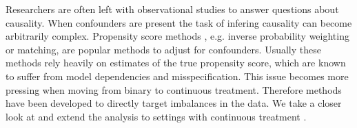 






Researchers are often left with observational studies to answer questions about causality. When confounders are present the task of infering causality can become arbitrarily complex. Propensity score methods \cite{Rosenbaum1983}, e.g. inverse probability weighting or matching, are popular methods to adjust for confounders. Usually these methods rely heavily on estimates of the true propensity score, which are known to suffer from model dependencies and misspecification\cite{Kang2007}. This issue becomes more pressing when moving from binary to continuous treatment\cite{Hirano2005}. Therefore methods have been developed to directly target imbalances in the data\cite{Fong2018}\cite{Hainmueller2012}\cite{Zubizarreta2015}.
We take a closer look at \cite{Wang2019} and extend the analysis to settings with continuous treatment 
\cite{Vegetabile2020}\cite{Tubbicke2020}.
